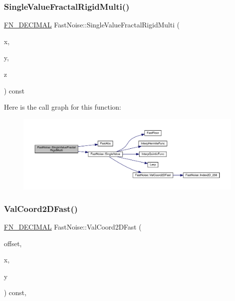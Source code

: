 \subsubsection{\texorpdfstring{Single\+Value\+Fractal\+Rigid\+Multi()}{SingleValueFractalRigidMulti()}\hspace{0.1cm}{\footnotesize\ttfamily [2/2]}}
{\footnotesize\ttfamily \mbox{\hyperlink{_fast_noise_8h_a75a9ef6d2541c4921815b885bfd449c3}{F\+N\+\_\+\+D\+E\+C\+I\+M\+AL}} Fast\+Noise\+::\+Single\+Value\+Fractal\+Rigid\+Multi (\begin{DoxyParamCaption}\item[{\mbox{\hyperlink{_fast_noise_8h_a75a9ef6d2541c4921815b885bfd449c3}{F\+N\+\_\+\+D\+E\+C\+I\+M\+AL}}}]{x,  }\item[{\mbox{\hyperlink{_fast_noise_8h_a75a9ef6d2541c4921815b885bfd449c3}{F\+N\+\_\+\+D\+E\+C\+I\+M\+AL}}}]{y,  }\item[{\mbox{\hyperlink{_fast_noise_8h_a75a9ef6d2541c4921815b885bfd449c3}{F\+N\+\_\+\+D\+E\+C\+I\+M\+AL}}}]{z }\end{DoxyParamCaption}) const\hspace{0.3cm}{\ttfamily [private]}}

Here is the call graph for this function\+:
\nopagebreak
\begin{figure}[H]
\begin{center}
\leavevmode
\includegraphics[width=350pt]{d1/dd8/class_fast_noise_a252117bcf7130247e06fa0bd1695c41e_cgraph}
\end{center}
\end{figure}
\mbox{\label{class_fast_noise_ace751d0f7929c892937cd97f3e0341a7}} 
\subsubsection{\texorpdfstring{Val\+Coord2\+D\+Fast()}{ValCoord2DFast()}}
{\footnotesize\ttfamily \mbox{\hyperlink{_fast_noise_8h_a75a9ef6d2541c4921815b885bfd449c3}{F\+N\+\_\+\+D\+E\+C\+I\+M\+AL}} Fast\+Noise\+::\+Val\+Coord2\+D\+Fast (\begin{DoxyParamCaption}\item[{unsigned char}]{offset,  }\item[{int}]{x,  }\item[{int}]{y }\end{DoxyParamCaption}) const\hspace{0.3cm}{\ttfamily [inline]}, {\ttfamily [private]}}

